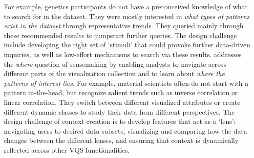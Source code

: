  For example, genetics participants do not have a preconceived knowledge of what to search for in the dataset. They were mostly interested in \textit{what types of patterns exist in the dataset} through representative trends. They queried mainly through these recommended results to jumpstart further queries. %
The design challenge include developing the right set of `stimuli' that could provoke further data-driven inquiries, as well as low-effort mechanisms to search via these results.
 addresses the \textit{where} question of sensemaking by enabling analysts to navigate across different parts of the visualization collection and to learn about \textit{where the patterns of interest lies}.%
For example, material scientists often do not start with a pattern in-the-head, but recognize salient trends such as inverse correlation or linear correlation. They switch between different visualized attributes or create different dynamic classes to study their data from different perspectives. The design challenge of context creation is to develop features that act as a `lens': navigating users to desired data subsets, visualizing and comparing how the data changes between the different lenses, and ensuring that context is dynamically reflected across other VQS functionalities.


